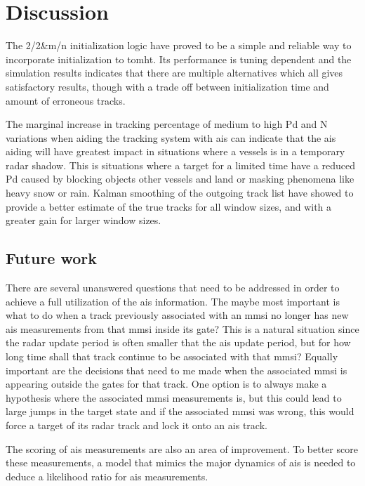 
\chapter{Discussion}\label{chapter:discussion}
The 2/2\&m/n initialization logic have proved to be a simple and reliable way to incorporate initialization to \gls{tomht}. Its performance is tuning dependent and the simulation results indicates that there are multiple alternatives which all gives satisfactory results, though with a trade off between initialization time and amount of erroneous tracks.

The marginal increase in tracking percentage of medium to high \gls{Pd} and N variations when aiding the tracking system with \gls{ais} can indicate that the \gls{ais} aiding will have greatest impact in situations where a vessels is in a temporary radar shadow. This is situations where a target for a limited time have a reduced \gls{Pd} caused by blocking objects other vessels and land or masking phenomena like heavy snow or rain. Kalman smoothing of the outgoing track list have showed to provide a better estimate of the true tracks for all window sizes, and with a greater gain for larger window sizes. 



\section{Future work}\label{sec:future-work}
There are several unanswered questions that need to be addressed in order to achieve a full utilization of the \gls{ais} information. The maybe most important is what to do when a track previously associated with an \gls{mmsi} no longer has new \gls{ais} measurements from that \gls{mmsi} inside its gate? This is a natural situation since the radar update period is often smaller that the \gls{ais} update period, but for how long time shall that track continue to be associated with that \gls{mmsi}? Equally important are the decisions that need to me made when the associated \gls{mmsi} is appearing outside the gates for that track. One option is to always make a hypothesis where the associated \gls{mmsi} measurements is, but this could lead to large jumps in the target state and if the associated \gls{mmsi} was wrong, this would force a target of its radar track and lock it onto an \gls{ais} track.

The scoring of \gls{ais} measurements are also an area of improvement. To better score these measurements, a model that mimics the major dynamics of \gls{ais} is needed to deduce a likelihood ratio for \gls{ais} measurements.

